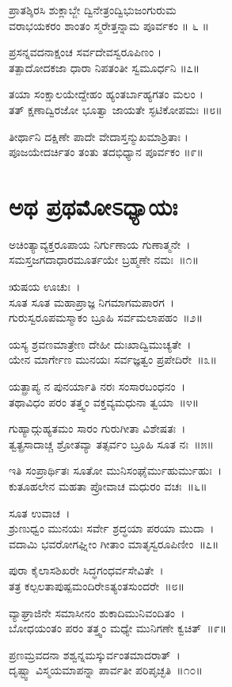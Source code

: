 ಪ್ರಾತಶ್ಶಿರಸಿ ಶುಕ್ಲಾಬ್ಜೇ ದ್ವಿನೇತ್ರಂದ್ವಿಭುಜಂಗುರುಮ\\
ವರಾಭಯಕರಂ ಶಾಂತಂ ಸ್ಮರೇತ್ತನ್ನಾಮ ಪೂರ್ವಕಂ ॥ ೬ ॥

ಪ್ರಸನ್ನವದನಾಕ್ಷಂಚ ಸರ್ವದೇವಸ್ವರೂಪಿಣಂ ।\\
ತತ್ಪಾದೋದಕಜಾ ಧಾರಾ ನಿಪತಂತೀ ಸ್ವಮೂರ್ಧನಿ ॥೭॥

ತಯಾ ಸಂಕ್ಷಾಲಯೇದ್ದೇಹಂ ಹ್ಯಂತರ್ಬಾಹ್ಯಗತಂ ಮಲಂ ।\\
ತತ್ ಕ್ಷಣಾದ್ವಿರಜೋ ಭೂತ್ವಾ ಜಾಯತೇ ಸ್ಫಟಿಕೋಪಮಃ ॥೮॥

ತೀರ್ಥಾನಿ ದಕ್ಷಿಣೇ ಪಾದೇ ವೇದಾಸ್ತನ್ಮುಖಮಾಶ್ರಿತಾಃ ।\\
ಪೂಜಯೇದರ್ಚಿತಂ ತಂತು ತದಭಿಧ್ಯಾನ ಪೂರ್ವಕಂ ॥೯॥

\section{ಅಥ ಪ್ರಥಮೋಽಧ್ಯಾಯಃ}
ಅಚಿಂತ್ಯಾವ್ಯಕ್ತರೂಪಾಯ ನಿರ್ಗುಣಾಯ ಗುಣಾತ್ಮನೇ~।\\
ಸಮಸ್ತಜಗದಾಧಾರಮೂರ್ತಯೇ ಬ್ರಹ್ಮಣೇ ನಮಃ~॥೧॥

ಋಷಯ ಊಚುಃ~।\\
ಸೂತ ಸೂತ ಮಹಾಪ್ರಾಜ್ಞ ನಿಗಮಾಗಮಪಾರಗ~।\\
ಗುರುಸ್ವರೂಪಮಸ್ಮಾಕಂ ಬ್ರೂಹಿ ಸರ್ವಮಲಾಪಹಂ~॥೨॥

ಯಸ್ಯ ಶ್ರವಣಮಾತ್ರೇಣ ದೇಹೀ ದುಃಖಾದ್ವಿಮುಚ್ಯತೇ~।\\
ಯೇನ ಮಾರ್ಗೇಣ ಮುನಯಃ ಸರ್ವಜ್ಞತ್ವಂ ಪ್ರಪೇದಿರೇ~॥೩॥

ಯತ್ಪ್ರಾಪ್ಯ ನ ಪುನರ್ಯಾತಿ ನರಃ ಸಂಸಾರಬಂಧನಂ~।\\
ತಥಾವಿಧಂ ಪರಂ ತತ್ತ್ವಂ ವಕ್ತವ್ಯಮಧುನಾ ತ್ವಯಾ~॥೪॥

ಗುಹ್ಯಾದ್ಗುಹ್ಯತಮಂ ಸಾರಂ ಗುರುಗೀತಾ ವಿಶೇಷತಃ~।\\
ತ್ವತ್ಪ್ರಸಾದಾಚ್ಚ ಶ್ರೋತವ್ಯಾ ತತ್ಸರ್ವಂ ಬ್ರೂಹಿ ಸೂತ ನಃ~॥೫॥

ಇತಿ ಸಂಪ್ರಾರ್ಥಿತಃ ಸೂತೋ ಮುನಿಸಂಘೈರ್ಮುಹುರ್ಮುಹುಃ~।\\
ಕುತೂಹಲೇನ ಮಹತಾ ಪ್ರೋವಾಚ ಮಧುರಂ ವಚಃ~॥೬॥

ಸೂತ ಉವಾಚ~।\\
ಶ್ರುಣುಧ್ವಂ ಮುನಯಃ ಸರ್ವೇ ಶ್ರದ್ಧಯಾ ಪರಯಾ ಮುದಾ~।\\
ವದಾಮಿ ಭವರೋಗಘ್ನೀಂ ಗೀತಾಂ ಮಾತೃಸ್ವರೂಪಿಣೀಂ~॥೭॥

ಪುರಾ ಕೈಲಾಸಶಿಖರೇ ಸಿದ್ಧಗಂಧರ್ವಸೇವಿತೇ~।\\
ತತ್ರ ಕಲ್ಪಲತಾಪುಷ್ಪಮಂದಿರೇಽತ್ಯಂತಸುಂದರೇ~॥೮॥

ವ್ಯಾಘ್ರಾಜಿನೇ ಸಮಾಸೀನಂ ಶುಕಾದಿಮುನಿವಂದಿತಂ~।\\
ಬೋಧಯಂತಂ ಪರಂ ತತ್ತ್ವಂ ಮಧ್ಯೇ ಮುನಿಗಣೇ ಕ್ವಚಿತ್~॥೯॥

ಪ್ರಣಮ್ರವದನಾ ಶಶ್ವನ್ನಮಸ್ಕುರ್ವಂತಮಾದರಾತ್~।\\
ದೃಷ್ಟ್ವಾ ವಿಸ್ಮಯಮಾಪನ್ನಾ ಪಾರ್ವತೀ ಪರಿಪೃಚ್ಛತಿ~॥೧೦॥

